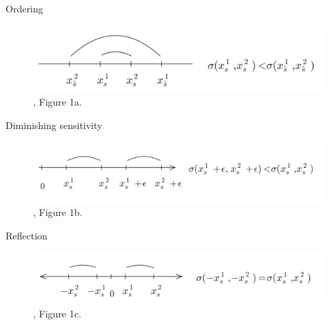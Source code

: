 \documentclass[11pt, aspectratio=169]{beamer}
\begin{document}
\begin{frame}{Ordering}
\begin{figure}
\centering
    \includegraphics[width = 0.99\textwidth]{ordering}
    \caption{\citet{BordaloGennaioliShleifer2012}, Figure 1a.}
    \end{figure}
\end{frame}

\begin{frame}{Diminishing sensitivity}
\begin{figure}
\centering
    \includegraphics[width = 0.99\textwidth]{diminishing_sensitivity}
    \caption{\citet{BordaloGennaioliShleifer2012}, Figure 1b.}
    \end{figure}
\end{frame}


\begin{frame}{Reflection}
\begin{figure}
\centering
    \includegraphics[width = 0.99\textwidth]{reflection}
    \caption{\citet{BordaloGennaioliShleifer2012}, Figure 1c.}
    \end{figure}
\end{frame}
\end{document}
